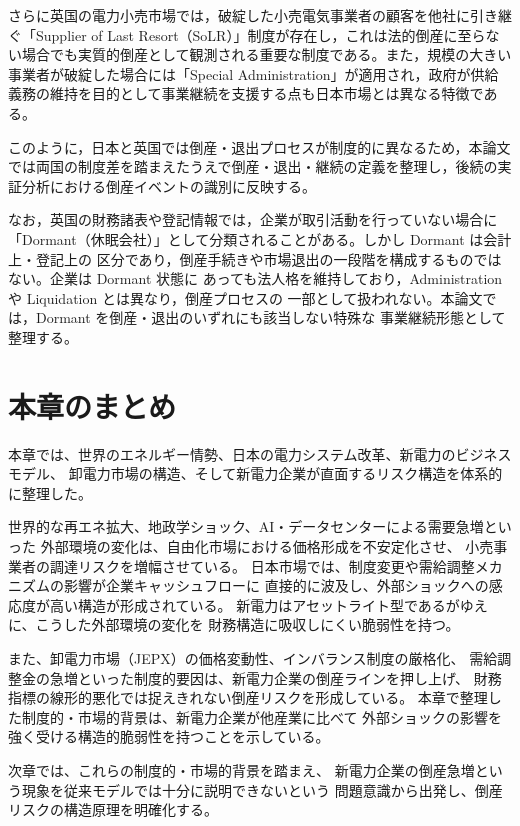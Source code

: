 さらに英国の電力小売市場では，破綻した小売電気事業者の顧客を他社に引き継ぐ「Supplier of Last Resort（SoLR）」制度が存在し，これは法的倒産に至らない場合でも実質的倒産として観測される重要な制度である。また，規模の大きい事業者が破綻した場合には「Special Administration」が適用され，政府が供給義務の維持を目的として事業継続を支援する点も日本市場とは異なる特徴である。

このように，日本と英国では倒産・退出プロセスが制度的に異なるため，本論文では両国の制度差を踏まえたうえで倒産・退出・継続の定義を整理し，後続の実証分析における倒産イベントの識別に反映する。

なお，英国の財務諸表や登記情報では，企業が取引活動を行っていない場合に
「Dormant（休眠会社）」として分類されることがある。しかし Dormant は会計上・登記上の
区分であり，倒産手続きや市場退出の一段階を構成するものではない。企業は Dormant 状態に
あっても法人格を維持しており，Administration や Liquidation とは異なり，倒産プロセスの
一部として扱われない。本論文では，Dormant を倒産・退出のいずれにも該当しない特殊な
事業継続形態として整理する。



\section{本章のまとめ}

本章では、世界のエネルギー情勢、日本の電力システム改革、新電力のビジネスモデル、
卸電力市場の構造、そして新電力企業が直面するリスク構造を体系的に整理した。

世界的な再エネ拡大、地政学ショック、AI・データセンターによる需要急増といった
外部環境の変化は、自由化市場における価格形成を不安定化させ、
小売事業者の調達リスクを増幅させている。
日本市場では、制度変更や需給調整メカニズムの影響が企業キャッシュフローに
直接的に波及し、外部ショックへの感応度が高い構造が形成されている。
新電力はアセットライト型であるがゆえに、こうした外部環境の変化を
財務構造に吸収しにくい脆弱性を持つ。

また、卸電力市場（JEPX）の価格変動性、インバランス制度の厳格化、
需給調整金の急増といった制度的要因は、新電力企業の倒産ラインを押し上げ、
財務指標の線形的悪化では捉えきれない倒産リスクを形成している。
本章で整理した制度的・市場的背景は、新電力企業が他産業に比べて
外部ショックの影響を強く受ける構造的脆弱性を持つことを示している。

次章では、これらの制度的・市場的背景を踏まえ、
新電力企業の倒産急増という現象を従来モデルでは十分に説明できないという
問題意識から出発し、倒産リスクの構造原理を明確化する。

